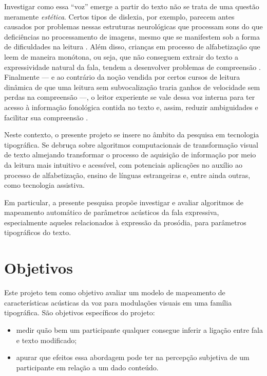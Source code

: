 \documentclass[a4paper,11pt,titlepage,singlespacing]{article}
\begin{document}
Investigar como essa ``voz'' emerge a partir do texto não se trata de uma questão meramente \textit{estética}. Certos tipos de dislexia, por exemplo, parecem antes causados por problemas nessas estruturas neurológicas que processam sons do que deficiências no processamento de imagens, mesmo que se manifestem sob a forma de dificuldades na  leitura \cite[cap.8]{seidenberg2017}. Além disso, crianças em processo de alfabetização que leem de maneira monótona, ou seja, que não conseguem extrair do texto a expressividade natural da fala, tendem a desenvolver problemas de compreensão \cite{bessemans2017}. Finalmente — e ao contrário da noção vendida por certos cursos de leitura dinâmica de que uma leitura sem subvocalização traria ganhos de velocidade sem perdas na compreensão —, o leitor experiente se vale dessa voz interna para ter acesso à informação fonológica contida no texto e, assim, reduzir ambiguidades e facilitar sua compreensão \cite[cap.4]{seidenberg2017}.

Neste contexto, o presente projeto se insere no âmbito da pesquisa em tecnologia tipográfica. Se debruça sobre algoritmos computacionais de transformação visual de texto almejando transformar o processo de aquisição de informação por meio da leitura mais intuitivo e acessível, com potenciais aplicações no auxílio ao processo de alfabetização, ensino de línguas estrangeiras e, entre ainda outras, como tecnologia assistiva.

Em particular, a presente pesquisa propõe investigar e avaliar algoritmos de mapeamento automático de parâmetros acústicos da fala expressiva, especialmente aqueles relacionados à expressão da prosódia, para parâmetros tipográficos do texto.



\section{Objetivos}

\noindent Este projeto tem como objetivo avaliar um modelo de mapeamento de características acústicas da voz para modulações visuais em uma família tipográfica. 
São objetivos específicos do projeto:
\begin{itemize}
    \item medir quão bem um participante qualquer consegue inferir a ligação entre fala e texto modificado;
    \item apurar que efeitos essa abordagem pode ter na percepção subjetiva de um participante em relação a um dado conteúdo.
\end{itemize} 
\end{document}
